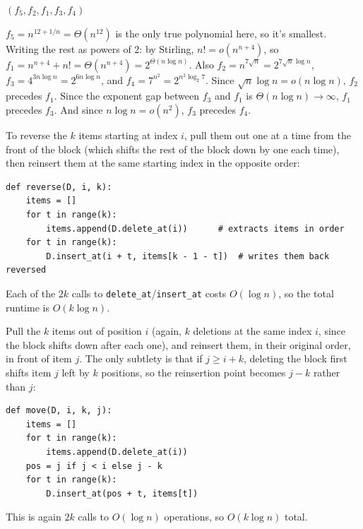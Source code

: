 \documentclass[12pt,twoside]{article}
\begin{document}
\begin{problems}
\begin{problemparts}
\problempart %
$(f_5, f_2, f_1, f_3, f_4)$

$f_5 = n^{12+1/n} = \Theta(n^{12})$ is the only true polynomial here, so it's smallest.
Writing the rest as powers of 2: by Stirling, $n! = o(n^{n+4})$, so
$f_1 = n^{n+4}+n! = \Theta(n^{n+4}) = 2^{\Theta(n\log n)}$. Also $f_2 = n^{7\sqrt n} =
2^{7\sqrt n \log n}$, $f_3 = 4^{3n\log n} = 2^{6n\log n}$, and $f_4 = 7^{n^2} =
2^{n^2\log_2 7}$. Since $\sqrt n \log n = o(n\log n)$, $f_2$ precedes $f_1$. Since the exponent
gap between $f_3$ and $f_1$ is $\Theta(n\log n)\to\infty$, $f_1$ precedes $f_3$. And since
$n\log n = o(n^2)$, $f_3$ precedes $f_4$.

\end{problemparts}

\newpage
\problem  %

\begin{problemparts}
\problempart %
To reverse the $k$ items starting at index $i$, pull them out one at a time from the front of
the block (which shifts the rest of the block down by one each time), then reinsert them at
the same starting index in the opposite order:

\begin{verbatim}
def reverse(D, i, k):
    items = []
    for t in range(k):
        items.append(D.delete_at(i))      # extracts items in order
    for t in range(k):
        D.insert_at(i + t, items[k - 1 - t])  # writes them back reversed
\end{verbatim}

Each of the $2k$ calls to \texttt{delete\_at}/\texttt{insert\_at} costs $O(\log n)$, so the
total runtime is $O(k\log n)$.

\problempart %
Pull the $k$ items out of position $i$ (again, $k$ deletions at the same index $i$, since the
block shifts down after each one), and reinsert them, in their original order, in front of
item $j$. The only subtlety is that if $j \geq i+k$, deleting the block first shifts item $j$
left by $k$ positions, so the reinsertion point becomes $j-k$ rather than $j$:

\begin{verbatim}
def move(D, i, k, j):
    items = []
    for t in range(k):
        items.append(D.delete_at(i))
    pos = j if j < i else j - k
    for t in range(k):
        D.insert_at(pos + t, items[t])
\end{verbatim}

This is again $2k$ calls to $O(\log n)$ operations, so $O(k\log n)$ total.
\end{problemparts}


\end{problems}
\end{document}
